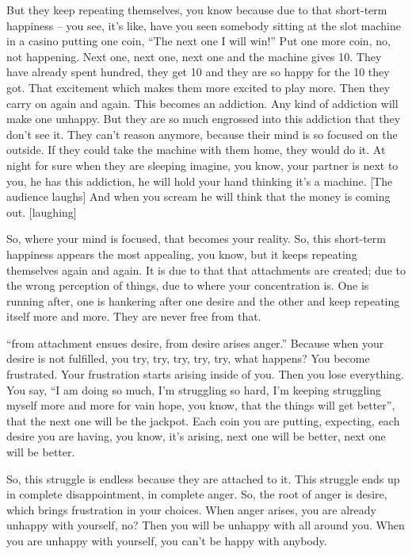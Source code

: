 But they keep repeating themselves, you know because due to that short-term happiness – you see, it’s like, have you seen somebody sitting at the slot machine in a casino putting one coin, “The next one I will win!” Put one more coin, no, not happening. Next one, next one, next one and the machine gives 10. They have already spent hundred, they get 10 and they are so happy for the 10 they got. That excitement which makes them more excited to play more. Then they carry on again and again. This becomes an addiction. Any kind of addiction will make one unhappy. But they are so much engrossed into this addiction that they don’t see it. They can’t reason anymore, because their mind is so focused on the outside. If they could take the machine with them home, they would do it. At night for sure when they are sleeping imagine, you know, your partner is next to you, he has this addiction, he will hold your hand thinking it’s a machine. [The audience laughs] And when you scream he will think that the money is coming out. [laughing]

So, where your mind is focused, that becomes your reality. So, this short-term happiness appears the most appealing, you know, but it keeps repeating themselves again and again. It is due to that that attachments are created; due to the wrong perception of things, due to where your concentration is. One is running after, one is hankering after one desire and the other and keep repeating itself more and more. They are never free from that.

“from attachment ensues desire, from desire arises anger.” Because when your desire is not fulfilled, you try, try, try, try, try, what happens? You become frustrated. Your frustration starts arising inside of you. Then you lose everything. You say, “I am doing so much, I’m struggling so hard, I’m keeping struggling myself more and more for vain hope, you know, that the things will get better”, that the next one will be the jackpot. Each coin you are putting, expecting, each desire you are having, you know, it’s arising, next one will be better, next one will be better.

So, this struggle is endless because they are attached to it. This struggle ends up in complete disappointment, in complete anger. So, the root of anger is desire, which brings frustration in your choices. When anger arises, you are already unhappy with yourself, no? Then you will be unhappy with all around you. When you are unhappy with yourself, you can’t be happy with anybody.

